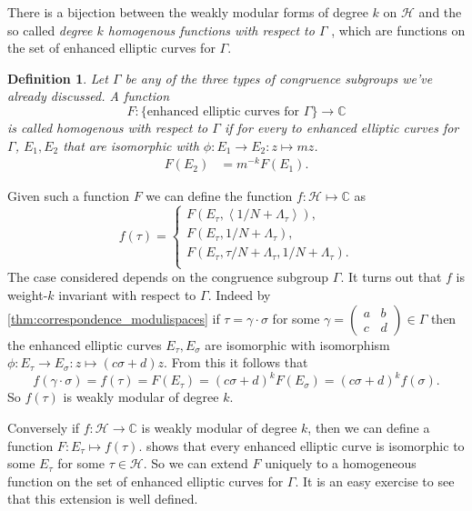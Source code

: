 \documentclass[titlepage,a4paper]{article}
\theoremstyle{theoremdd}
\theoremstyle{definitiondd}
\newtheorem{definition}[theorem]{Definition}
\theoremstyle{remarkdd}
\newcommand{\C}{\mathbb{C}}
\begin{document}
There is a bijection between the weakly modular forms of degree $k$ on $\mathcal{H}$ and the so called  \emph{degree $k$ homogenous functions with respect to $\Gamma$ }, which are functions on the set of enhanced elliptic curves for $\Gamma$. 
\begin{definition}
	Let $\Gamma$ be any of the three types of congruence subgroups we've already discussed. 
	A function \[
	F: \{\text{enhanced elliptic curves for $\Gamma$}\} \to \C
	\]
	is called \emph{homogenous with respect to $\Gamma$} if for every to enhanced elliptic curves for $\Gamma$, $E_1, E_2$ that are isomorphic with $\phi:E_1 \to E_2: z\mapsto m z $.
		\begin{align*}
			F\left(E_2\right) &= m^{-k}F\left(E_1\right) 
		.\end{align*}
\end{definition}
Given such a function $F$ we can define the function $f: \mathcal{H} \mapsto  \C$  as \[
	f(\tau) = \begin{cases}
		F(E_\tau, \left<1 / N + \Lambda_\tau\right>), \\
		F(E_\tau, 1 / N + \Lambda_\tau), \\
		F(E_\tau, \tau / N + \Lambda_\tau, 1 / N + \Lambda_\tau). \\
	\end{cases}
\] 
The case considered depends on the congruence subgroup $\Gamma$.
It turns out that  $f$ is weight-$k$ invariant with respect to $\Gamma$. Indeed by \cref{thm:correspondence_modulispaces} if $\tau = \gamma \cdot \sigma$ for some  $\gamma = \begin{pmatrix} a & b \\ c & d \end{pmatrix}  \in \Gamma$ then the enhanced elliptic curves  $E_\tau, E_\sigma$ are isomorphic with isomorphism $\phi: E_\tau \to E_\sigma: z \mapsto (c \sigma + d) z$.
From this it follows that \[
	f(\gamma\cdot \sigma) = f(\tau) = F(E_\tau) = (c \sigma + d)^{k}F(E_\sigma) = (c \sigma + d)^{k}f(\sigma)
.\]
So $f(\tau )$ is weakly modular of degree $k$.

Conversely if $f: \mathcal{H}  \to \C$ is weakly modular of degree $k$, then we can define a function $F: E_\tau\mapsto f(\tau)$. 
 shows that every enhanced elliptic curve is isomorphic to some $E_\tau$ for some $\tau \in \mathcal{H} $. So we can extend $F$ uniquely to a homogeneous function on the set of enhanced elliptic curves for  $\Gamma$. 
It is an easy exercise to see that this extension is well defined. 
\end{document}
